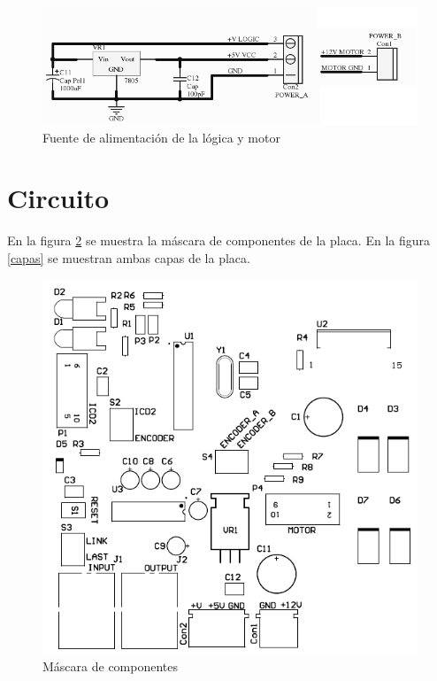 \documentclass[a4paper,10pt]{article}
\begin{document}
\begin{figure}
\centering
\includegraphics[scale=.3]{schemaFuente.png}
\caption{Fuente de alimentaci\'on de la l\'ogica y motor}
\label{schema5}
\end{figure}

\section{Circuito}
\label{circuito}

En la figura \ref{componentes} se muestra la m\'ascara de componentes de la placa.
En la figura \ref{capas} se muestran ambas capas de la placa.

\begin{figure}
\centering
\includegraphics[scale=.3]{componentes.png}
\caption{M\'ascara de componentes}
\label{componentes}
\end{figure}
\end{document}
